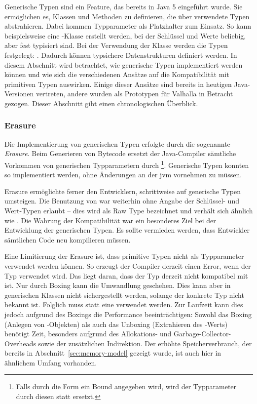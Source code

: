 Generische Typen sind ein Feature, das bereits in Java 5 eingeführt wurde.
Sie ermöglichen es, Klassen und Methoden zu definieren, die über verwendete Typen abstrahieren.
Dabei kommen Typparameter als Platzhalter zum Einsatz.
So kann beispielsweise eine -Klasse erstellt werden, bei der Schlüssel und Werte beliebig, aber fest typisiert sind.
Bei der Verwendung der Klasse werden die Typen festgelegt: .
Dadurch können typsichere Datenstrukturen definiert werden.
In diesem Abschnitt wird betrachtet, wie generische Typen implementiert werden können und wie sich die verschiedenen Ansätze auf die Kompatibilität mit primitiven Typen auswirken.
Einige dieser Ansätze sind bereits in heutigen Java-Versionen vertreten, andere wurden als Prototypen für Valhalla in Betracht gezogen.
Dieser Abschnitt gibt einen chronologischen Überblick.

\subsubsection{Erasure}

Die Implementierung von generischen Typen erfolgte durch die sogenannte \emph{Erasure}.
Beim Generieren von Bytecode ersetzt der Java-Compiler sämtliche Vorkommen von generischen Typparametern durch \footnote{Falls durch die Form  ein Bound angegeben wird, wird der Typparameter durch diesen statt  ersetzt.}.
Generische Typen konnten so implementiert werden, ohne Änderungen an der \ac{jvm} vornehmen zu müssen.

Erasure ermöglichte ferner den Entwicklern, schrittweise auf generische Typen umsteigen.
Die Benutzung von  war weiterhin ohne Angabe der Schlüssel- und Wert-Typen erlaubt -- dies wird als Raw Type bezeichnet und verhält sich ähnlich wie .
Die Wahrung der Kompatibilität war ein besonderes Ziel bei der Entwicklung der generischen Typen.
Es sollte vermieden werden, dass Entwickler sämtlichen Code neu kompilieren müssen.

Eine Limitierung der Erasure ist, dass primitive Typen nicht als Typparameter verwendet werden können.
So erzeugt der Compiler derzeit einen Error, wenn der Typ  verwendet wird.
Das liegt daran, dass der Typ  derzeit nicht kompatibel mit  ist.
Nur durch Boxing kann die Umwandlung  geschehen.
Dies kann aber in generischen Klassen nicht sichergestellt werden, solange der konkrete Typ nicht bekannt ist.
Folglich muss statt  eine  verwendet werden.
Zur Laufzeit kann dies jedoch aufgrund des Boxings die Performance beeinträchtigen:
Sowohl das Boxing (Anlegen von -Objekten) als auch das Unboxing (Extrahieren des -Werts) benötigt Zeit, besonders aufgrund des Allokations- und Garbage-Collector-Overheads sowie der zusätzlichen Indirektion.
Der erhöhte Speicherverbrauch, der bereits in Abschnitt~\ref{sec:memory-model} gezeigt wurde, ist auch hier in ähnlichem Umfang vorhanden.

